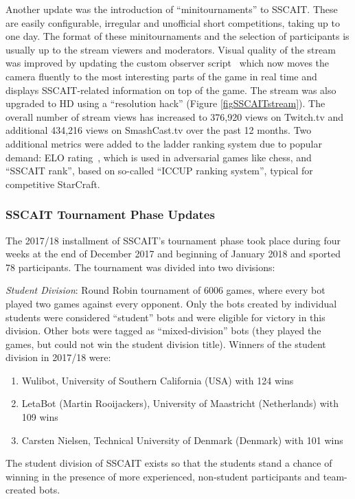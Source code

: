 Another update was the introduction of ``minitournaments'' to SSCAIT. These are easily configurable, irregular and unofficial short competitions, taking up to one day. The format of these minitournaments and the selection of participants is usually up to the stream viewers and moderators. Visual quality of the stream was improved by updating the custom observer script~\cite{mattsson2015automatic} which now moves the camera fluently to the most interesting parts of the game in real time and displays SSCAIT-related information on top of the game. The stream was also upgraded to HD using a ``resolution hack'' (Figure \ref{figSSCAITstream}). 
The overall number of stream views has increased to 376,920 views on Twitch.tv and additional 434,216 views on SmashCast.tv over the past 12 months. Two additional metrics were added to the ladder ranking system due to popular demand: ELO rating~\cite{elo1978rating}, which is used in adversarial games like chess, and ``SSCAIT rank'', based on so-called ``ICCUP ranking system'', typical for competitive StarCraft.

\subsubsection*{SSCAIT Tournament Phase Updates}

The 2017/18 installment of SSCAIT's tournament phase took place during four weeks at the end of December 2017 and beginning of January 2018 and sported 78 participants. The tournament was divided into two divisions:

\emph{Student Division}: Round Robin tournament of 6006 games, where every bot played two games against every opponent. Only the bots created by individual students were considered ``student'' bots and were eligible for victory in this division. Other bots were tagged as ``mixed-division'' bots (they played the games, but could not win the student division title). Winners of the student division in 2017/18 were:
  \begin{enumerate}
	\item Wulibot, University of Southern California (USA) with 124 wins
	\item LetaBot (Martin Rooijackers), University of Maastricht (Netherlands) with 109 wins
	\item Carsten Nielsen, Technical University of Denmark (Denmark) with 101 wins
  \end{enumerate}
The student division of SSCAIT exists so that the students stand a chance of winning in the presence of more experienced, non-student participants and team-created bots.

